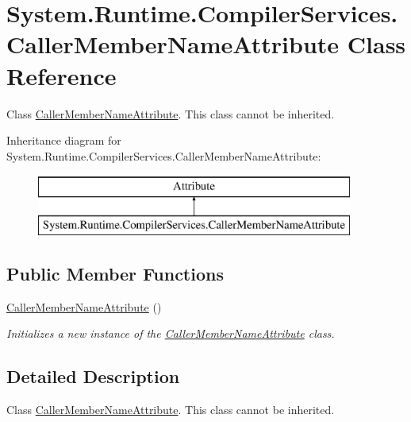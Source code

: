 \hypertarget{class_system_1_1_runtime_1_1_compiler_services_1_1_caller_member_name_attribute}{}\section{System.\+Runtime.\+Compiler\+Services.\+Caller\+Member\+Name\+Attribute Class Reference}
\label{class_system_1_1_runtime_1_1_compiler_services_1_1_caller_member_name_attribute}


Class \hyperlink{class_system_1_1_runtime_1_1_compiler_services_1_1_caller_member_name_attribute}{Caller\+Member\+Name\+Attribute}. This class cannot be inherited.  


Inheritance diagram for System.\+Runtime.\+Compiler\+Services.\+Caller\+Member\+Name\+Attribute\+:\begin{figure}[H]
\begin{center}
\leavevmode
\includegraphics[height=2.000000cm]{class_system_1_1_runtime_1_1_compiler_services_1_1_caller_member_name_attribute}
\end{center}
\end{figure}
\subsection*{Public Member Functions}
\begin{DoxyCompactItemize}
\item 
\hyperlink{class_system_1_1_runtime_1_1_compiler_services_1_1_caller_member_name_attribute_acaf49a58a4905a9b8135b96ae80cab0c}{Caller\+Member\+Name\+Attribute} ()
\begin{DoxyCompactList}\small\item\em Initializes a new instance of the \hyperlink{class_system_1_1_runtime_1_1_compiler_services_1_1_caller_member_name_attribute}{Caller\+Member\+Name\+Attribute} class. \end{DoxyCompactList}\end{DoxyCompactItemize}


\subsection{Detailed Description}
Class \hyperlink{class_system_1_1_runtime_1_1_compiler_services_1_1_caller_member_name_attribute}{Caller\+Member\+Name\+Attribute}. This class cannot be inherited. 

